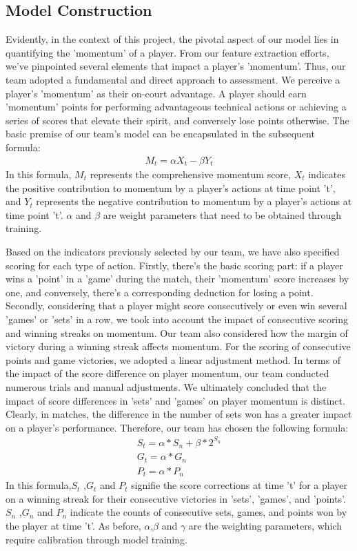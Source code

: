 \documentclass[12pt]{article}  %
\begin{document}
\subsection{Model Construction}
Evidently, in the context of this project, 
the pivotal aspect of our model lies in quantifying the 'momentum' of a player. From our feature extraction efforts, 
we've pinpointed several elements that impact a player's 'momentum'. Thus, our team adopted a fundamental and direct approach to assessment.
 We perceive a player's 'momentum' as their on-court advantage. A player should earn 'momentum' points 
 for performing advantageous technical actions or achieving a series of scores that elevate their spirit, 
and conversely lose points otherwise. The basic premise of our team's model can be encapsulated in the subsequent formula:
\begin{align} %
    M_t = \alpha X_t - \beta Y_t
\end{align}
In this formula, $M_t$ represents the comprehensive momentum score, 
$X_t$ indicates the positive contribution to momentum by a player's actions at time point 't', 
and $Y_t$ represents the negative contribution to momentum by a player's actions at time point 't'. 
$ \alpha $ and $ \beta $ are weight parameters that need to be obtained through training.

Based on the indicators previously selected by our team, 
we have also specified scoring for each type of action. 
Firstly, there's the basic scoring part: if a player wins a 'point' in a 'game' during the match, 
their 'momentum' score increases by one, and conversely, there's a corresponding deduction for losing a point. 
Secondly, considering that a player might score consecutively or even win several 'games' or 'sets' in a row, 
we took into account the impact of consecutive scoring and winning streaks on momentum. 
Our team also considered how the margin of victory during a winning streak affects momentum. 
For the scoring of consecutive points and game victories, we adopted a linear adjustment method. 
In terms of the impact of the score difference on player momentum, 
our team conducted numerous trials and manual adjustments. 
We ultimately concluded that the impact of score differences in 'sets' and 'games' on player momentum is distinct. Clearly, in matches, 
the difference in the number of sets won has a greater impact on a player's performance. Therefore, our team has chosen the following formula:
\begin{align} %
    S_t = \alpha * S_n + \beta * 2^{S_n}\\
    G_t = \alpha * G_n \\
    P_t = \alpha * P_n
\end{align}
In this formula,$S_t$ ,$G_t$  and $P_t$ signifie the score corrections at time 't' for a player 
on a winning streak for their consecutive victories in 'sets', 'games', and 'points'. 
$S_n$ ,$G_n$  and $P_n$ indicate the counts of consecutive sets, games, and points won by the player at time 't'. As before, 
$ \alpha $,$ \beta $ and $\gamma$ are the weighting parameters, which require calibration through model training.
\end{document}
